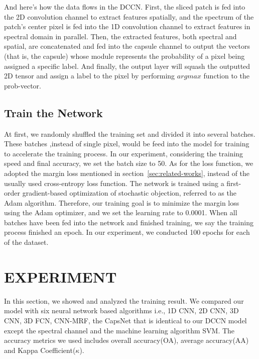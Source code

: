 \documentclass{article}
\begin{document}
	And here's how the data flows in the DCCN.
	First, the sliced patch is fed into the 2D convolution channel to extract features spatially, and the spectrum
	of the patch's center pixel is fed into the 1D convolution channel to extract features in spectral domain in
	parallel.
	Then, the extracted features, both spectral and spatial, are concatenated and fed into the capsule channel to output
	the vectors (that is, the capsule) whose module represents the probability of a pixel being assigned a specific
	label.
	And finally, the output layer will squash the outputted 2D tensor and assign a label to the pixel by performing
	$argmax$ function to the prob-vector.

	\subsection{Train the Network}\label{subsec:train-the-network}
	At first, we randomly shuffled the training set and divided it into several batches.
	These batches ,instead of single pixel, would be feed into the model for training to accelerate the training process.
	In our experiment, considering the training speed and final accuracy, we set the batch size to 50.
	As for the loss function, we adopted the margin loss mentioned in section~\ref{sec:related-works}, instead of the
	usually used cross-entropy loss function.
	The network is trained using a first-order gradient-based optimization of stochastic objection, referred to as the
	Adam algorithm.
	Therefore, our training goal is to minimize the margin loss using the Adam optimizer, and we set the learning rate
	to 0.0001.
	When all batches have been fed into the network and finished training, we say the training process finished an epoch.
	In our experiment, we conducted 100 epochs for each of the dataset.



	\section{EXPERIMENT}\label{sec:experiment}
	In this section, we showed and analyzed the training result.
	We compared our model with six neural network based algorithms i.e.,
	1D CNN\cite{hu2015deep},
	2D CNN\cite{sharma2016hyperspectral},
	3D CNN\cite{hamida20183},
	3D FCN\cite{lee2016contextual},
	CNN-MRF\cite{cao2018hyperspectral},
	the CapsNet that is identical to our DCCN model except the spectral channel and the machine learning algorithm SVM\@.
	The accuracy metrics we used includes overall accuracy(OA), average accuracy(AA) and Kappa Coefficient($\kappa$).
\end{document}
